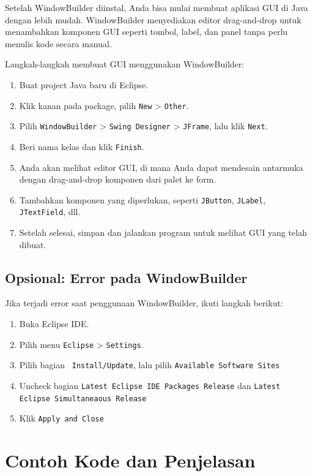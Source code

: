 Setelah WindowBuilder diinstal, Anda bisa mulai membuat aplikasi GUI di Java dengan lebih mudah. WindowBuilder menyediakan editor drag-and-drop untuk menambahkan komponen GUI seperti tombol, label, dan panel tanpa perlu menulis kode secara manual.

Langkah-langkah membuat GUI menggunakan WindowBuilder:
\begin{enumerate}
	\item Buat project Java baru di Eclipse.
	\item Klik kanan pada package, pilih \texttt{New} > \texttt{Other}.
	\item Pilih \texttt{WindowBuilder} > \texttt{Swing Designer} > \texttt{JFrame}, lalu klik \texttt{Next}.
	\item Beri nama kelas dan klik \texttt{Finish}.
	\item Anda akan melihat editor GUI, di mana Anda dapat mendesain antarmuka dengan drag-and-drop komponen dari palet ke form.
	\item Tambahkan komponen yang diperlukan, seperti \texttt{JButton}, \texttt{JLabel}, \texttt{JTextField}, dll.
	\item Setelah selesai, simpan dan jalankan program untuk melihat GUI yang telah dibuat.
\end{enumerate}



\subsection{Opsional: Error pada WindowBuilder}

Jika terjadi error saat penggunaan WindowBuilder, ikuti langkah berikut:

\begin{enumerate}
	\item Buka Eclipse IDE.
	\item Pilih menu \texttt{Eclipse} > \texttt{Settings}.
	\item Pilih bagian \texttt{ Install/Update}, lalu pilih  \texttt{Available Software Sites}
	\item Uncheck bagian \texttt{Latest Eclipse IDE Packages Release} dan  \texttt{Latest Eclipse Simultaneaous Release}
	\item Klik \texttt{Apply and Close}
\end{enumerate}



	
\section{Contoh Kode dan Penjelasan}

